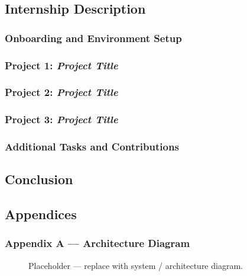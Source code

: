 \documentclass[11pt,a4paper]{article}
\begin{document}
\subsection{Internship Description}

\subsubsection{Onboarding and Environment Setup}
\lipsum[3]

\subsubsection{Project 1: \textit{Project Title}}
\lipsum[4]

\subsubsection{Project 2: \textit{Project Title}}
\lipsum[5]

\subsubsection{Project 3: \textit{Project Title}}
\lipsum[6]

\subsubsection{Additional Tasks and Contributions}
\lipsum[7]

\subsection{Conclusion}
\lipsum[8]

\newpage
\subsection{Appendices}

\subsubsection*{Appendix A — Architecture Diagram}
\begin{figure}[H]
  \centering
  \fbox{\rule{0pt}{6cm}\rule{12cm}{0pt}}
  \caption{Placeholder — replace with system / architecture diagram.}
  \label{fig:architecture}
\end{figure}
\end{document}
